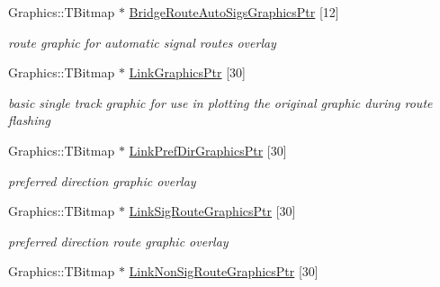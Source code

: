 \begin{DoxyCompactItemize}
\mbox{\label{class_t_rail_graphics_ae2d2f59cedfc45224c5d631a838c9e09}} 
Graphics\+::\+T\+Bitmap $\ast$ \mbox{\hyperlink{class_t_rail_graphics_ae2d2f59cedfc45224c5d631a838c9e09}{Bridge\+Route\+Auto\+Sigs\+Graphics\+Ptr}} \mbox{[}12\mbox{]}
\begin{DoxyCompactList}\small\item\em route graphic for automatic signal routes overlay \end{DoxyCompactList}\item 
\mbox{\label{class_t_rail_graphics_a5a8a35855ca9c072bab1d4165b8e35c7}} 
Graphics\+::\+T\+Bitmap $\ast$ \mbox{\hyperlink{class_t_rail_graphics_a5a8a35855ca9c072bab1d4165b8e35c7}{Link\+Graphics\+Ptr}} \mbox{[}30\mbox{]}
\begin{DoxyCompactList}\small\item\em basic single track graphic for use in plotting the original graphic during route flashing \end{DoxyCompactList}\item 
\mbox{\label{class_t_rail_graphics_ab918d197d082d0d2a892c0a9a06b1791}} 
Graphics\+::\+T\+Bitmap $\ast$ \mbox{\hyperlink{class_t_rail_graphics_ab918d197d082d0d2a892c0a9a06b1791}{Link\+Pref\+Dir\+Graphics\+Ptr}} \mbox{[}30\mbox{]}
\begin{DoxyCompactList}\small\item\em preferred direction graphic overlay \end{DoxyCompactList}\item 
\mbox{\label{class_t_rail_graphics_ab21f66a251f2bf5a048ac66362e473d7}} 
Graphics\+::\+T\+Bitmap $\ast$ \mbox{\hyperlink{class_t_rail_graphics_ab21f66a251f2bf5a048ac66362e473d7}{Link\+Sig\+Route\+Graphics\+Ptr}} \mbox{[}30\mbox{]}
\begin{DoxyCompactList}\small\item\em preferred direction route graphic overlay \end{DoxyCompactList}\item 
\mbox{\label{class_t_rail_graphics_adfffeb3f165e36643fff2e6beae3ab1c}} 
Graphics\+::\+T\+Bitmap $\ast$ \mbox{\hyperlink{class_t_rail_graphics_adfffeb3f165e36643fff2e6beae3ab1c}{Link\+Non\+Sig\+Route\+Graphics\+Ptr}} \mbox{[}30\mbox{]}

\end{DoxyCompactItemize}
